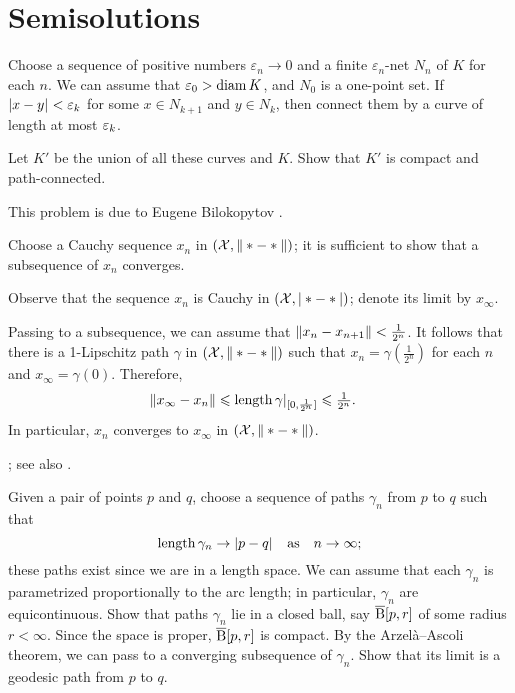 
\chapter{Semisolutions}

Choose a sequence of positive numbers $\varepsilon_n\to 0$ and a finite $\varepsilon_n$-net $N_n$ of $K$ for each $n$.
We can assume that $\varepsilon_0>\operatorname{\rm diam}\nolimits K$, and $N_0$ is a one-point set.
If $|{x}-{y}|_{}^{{}}<\varepsilon_k$ for some $x\in N_{k+1}$ and $y\in N_{k}$, then connect them by a curve of length at most $\varepsilon_k$.

Let $K'$ be the union of all these curves and $K$.
Show that $K'$ is compact and path-connected.

 This problem is due to Eugene Bilokopytov \cite{bilokopytov}.

Choose a Cauchy sequence $x_n$ in $(\mathcal{X},\|*-*\|)$; it is sufficient to show that a subsequence of $x_n$ converges.

Observe that the sequence $x_n$ is Cauchy in $(\mathcal{X},|*-*|)$;
denote its limit by $x_\infty$.

Passing to a subsequence, we can assume that $\|x_n-x_{n+1}\|<\tfrac1{2^n}$.
It follows that there is a 1-Lipschitz path $\gamma$ in $(\mathcal{X},\|*-*\|)$ such that $x_n=\gamma(\tfrac1{2^n})$ for each $n$ and $x_\infty=\gamma(0)$.
Therefore,
\begin{align*}
\|x_\infty-x_n\|&\leqslant \mathop{\rm length}\nolimits\gamma|_{[0,\frac1{2^n}]}\leqslant \tfrac1{2^n}.
\end{align*}
In particular, $x_n$ converges to $x_\infty$ in $(\mathcal{X},\|*-*\|)$.

 \cite[Corollary]{hu-kirk}; see also \cite[Lemma 2.3]{petrunin-stadler}.

Given a pair of points $p$ and $q$, choose a sequence of paths $\gamma_n$ from $p$ to $q$ such that
\[\mathop{\rm length}\nolimits\gamma_n\to |{p}-{q}|_{}^{{}}
\quad\text{as}\quad
n\to\infty;\]
these paths exist since we are in a length space.
We can assume that each $\gamma_n$ is parametrized proportionally to the arc length;
in particular, $\gamma_n$ are equicontinuous.
Show that paths $\gamma_n$ lie in a closed ball, say $\overline{\mathrm{B}}{}[p,r]$ of some radius $r<\infty$.
Since the space is proper, $\overline{\mathrm{B}}{}[p,r]$ is compact.
By the Arzelà--Ascoli theorem, we can pass to a converging subsequence of $\gamma_n$.
Show that its limit is a geodesic path from $p$ to $q$.

